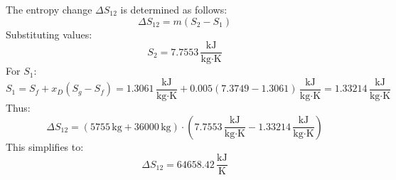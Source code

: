The entropy change \( \Delta S_{12} \) is determined as follows:  
\[
\Delta S_{12} = m (S_2 - S_1)
\]  
Substituting values:  
\[
S_2 = 7.7553 \, \frac{\text{kJ}}{\text{kg·K}}
\]  
For \( S_1 \):  
\[
S_1 = S_f + x_D (S_g - S_f) = 1.3061 \, \frac{\text{kJ}}{\text{kg·K}} + 0.005 (7.3749 - 1.3061) \, \frac{\text{kJ}}{\text{kg·K}} = 1.33214 \, \frac{\text{kJ}}{\text{kg·K}}
\]  
Thus:  
\[
\Delta S_{12} = (5755 \, \text{kg} + 36000 \, \text{kg}) \cdot (7.7553 \, \frac{\text{kJ}}{\text{kg·K}} - 1.33214 \, \frac{\text{kJ}}{\text{kg·K}})
\]  
This simplifies to:  
\[
\Delta S_{12} = 64658.42 \, \frac{\text{kJ}}{\text{K}}
\]